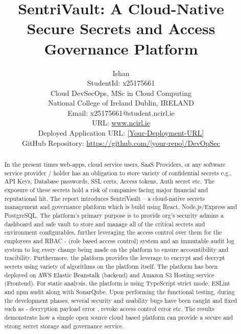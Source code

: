 \documentclass[conference]{IEEEtran}
\begin{document}
% 

\title{SentriVault: A Cloud-Native Secure Secrets and Access Governance Platform}

\author{Ishan\\
StudentId: x25175661\\
Cloud DevSecOps, MSc in Cloud Computing\\
National College of Ireland Dublin, IRELAND\\
Email: x25175661@student.ncirl.ie\\
URL: \url{www.ncirl.ie}\\
Deployed Application URL: \url{[Your-Deployment-URL]}\\
GitHub Repository: \url{https://github.com/[your-repo]/DevOpSec}}

\maketitle

\begin{abstract}
In the present times web-apps, cloud service users, SaaS Providers, or any software service provider / holder has an obligation to store variety of confidential secrets e.g., API Keys, Database passwords, SSL certs, Access tokens, Auth secret etc. The exposure of these secrets hold a risk of companies facing major financial and reputational hit. The report introduces SentriVault -- a cloud-native secrets management and governance platform which is build using React, Node.js/Express and PostgreSQL. The platform's primary purpose is to provide org's security admins a dashboard and safe vault to store and manage all of the critical secrets and environment configurables, further leveraging the access control over them for the employees and RBAC - (role based access control) system and an immutable audit log system to log every change being made on the platform to ensure accountibility and tracibility. Furthermore, the platform provides the leverage to encrypt and decrypt secrets using variety of algorithms on the platform itself. The platform has been deployed on AWS Elastic Beanstalk (backend) and Amazon S3 Hosting service (Frontend). For static analysis, the platform is using TypeScript strict mode, ESLint and npm audit along with SonarQube. Upon performing the functional testing, during the development phases, several security and usability bugs have been caught and fixed such as - decryption payload error , revoke access control error etc. The results demonstrate how a simple open source cloud based platform can provide a secure and strong secret storage and governance service.
\end{abstract}
\end{document}
